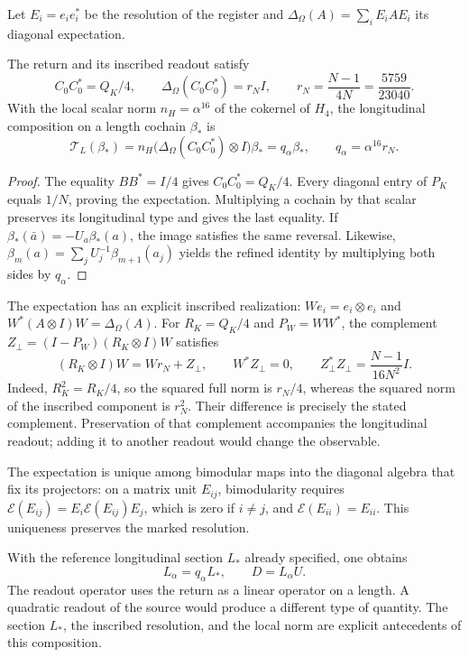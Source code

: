 Let $E_i=e_ie_i^*$ be the resolution of the register and
$\Delta_\Omega(A)=\sum_iE_iAE_i$ its diagonal expectation.

\begin{lemma}
\label{md:rigidez:retorno}
The return and its inscribed readout satisfy
\[
 C_0C_0^*=Q_K/4,\qquad
 \Delta_\Omega(C_0C_0^*)=r_NI,\qquad
 r_N=\frac{N-1}{4N}=\frac{5759}{23040}.
\]
With the local scalar norm $n_H=\alpha^{16}$ of the cokernel of $H_4$,
the longitudinal composition on a length cochain $\beta_*$ is
\[
 \mathscr T_L(\beta_*)=
 n_H\bigl(\Delta_\Omega(C_0C_0^*)\otimes I\bigr)\beta_*
 =q_\alpha\beta_*,
 \qquad q_\alpha=\alpha^{16}r_N.
 \label{md:rigidez:qalpha}
\]
\end{lemma}
\begin{proof}
The equality $BB^*=I/4$ gives $C_0C_0^*=Q_K/4$. Every diagonal entry
of $P_K$ equals $1/N$, proving the expectation. Multiplying a cochain
by that scalar preserves its longitudinal type and gives the last
equality. If $\beta_*(\bar a)=-U_a\beta_*(a)$, the image satisfies
the same reversal. Likewise,
$\beta_m(a)=\sum_jU_j^{-1}\beta_{m+1}(a_j)$ yields the refined identity
by multiplying both sides by $q_\alpha$.
\end{proof}

The expectation has an explicit inscribed realization:
$We_i=e_i\otimes e_i$ and
$W^*(A\otimes I)W=\Delta_\Omega(A)$. For
$R_K=Q_K/4$ and $P_W=WW^*$, the complement
$Z_\perp=(I-P_W)(R_K\otimes I)W$ satisfies
\[
 (R_K\otimes I)W=Wr_N+Z_\perp,\qquad W^*Z_\perp=0,\qquad
 Z_\perp^*Z_\perp=\frac{N-1}{16N^2}I.
\]
Indeed, $R_K^2=R_K/4$, so the squared full norm is $r_N/4$,
whereas the squared norm of the inscribed component is $r_N^2$.
Their difference is precisely the stated complement. Preservation of
that complement accompanies the longitudinal readout; adding it to
another readout would change the observable.

The expectation is unique among bimodular maps into the diagonal algebra
that fix its projectors: on a matrix unit $E_{ij}$, bimodularity requires
$\mathcal E(E_{ij})=E_i\mathcal E(E_{ij})E_j$, which is zero if $i\ne j$,
and $\mathcal E(E_{ii})=E_{ii}$. This uniqueness preserves the marked
resolution.

With the reference longitudinal section $L_*$ already specified, one obtains
\begin{equation}
 L_\alpha=q_\alpha L_*,\qquad D=L_\alpha U.
 \label{md:rigidez:longitud-def}
\end{equation}
The readout operator uses the return as a linear operator on a length.
A quadratic readout of the source would produce a different type of
quantity. The section $L_*$, the inscribed resolution, and the local
norm are explicit antecedents of this composition.

